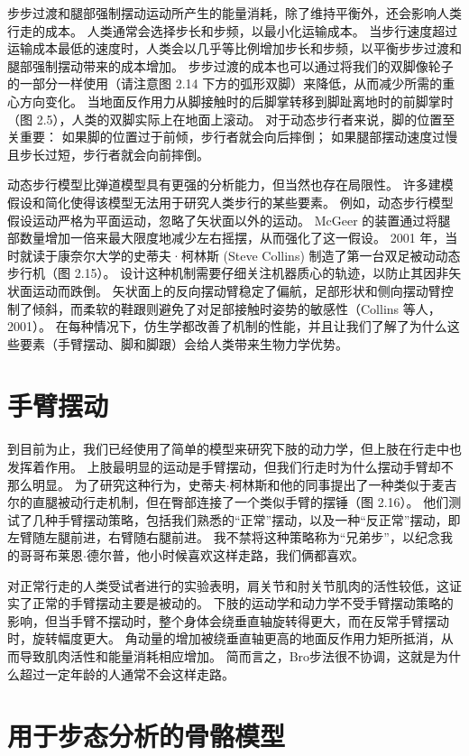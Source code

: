 步步过渡和腿部强制摆动运动所产生的能量消耗，除了维持平衡外，还会影响人类行走的成本。
人类通常会选择步长和步频，以最小化运输成本。
当步行速度超过运输成本最低的速度时，人类会以几乎等比例增加步长和步频，以平衡步步过渡和腿部强制摆动带来的成本增加。
步步过渡的成本也可以通过将我们的双脚像轮子的一部分一样使用（请注意图 2.14 下方的弧形双脚）来降低，从而减少所需的重心方向变化。
当地面反作用力从脚接触时的后脚掌转移到脚趾离地时的前脚掌时（图 2.5），人类的双脚实际上在地面上滚动。
对于动态步行者来说，脚的位置至关重要：
如果脚的位置过于前倾，步行者就会向后摔倒；
如果腿部摆动速度过慢且步长过短，步行者就会向前摔倒。


动态步行模型比弹道模型具有更强的分析能力，但当然也存在局限性。
许多建模假设和简化使得该模型无法用于研究人类步行的某些要素。
例如，动态步行模型假设运动严格为平面运动，忽略了矢状面以外的运动。
McGeer 的装置通过将腿部数量增加一倍来最大限度地减少左右摇摆，从而强化了这一假设。
2001 年，当时就读于康奈尔大学的史蒂夫·柯林斯 (Steve Collins) 制造了第一台双足被动动态步行机（图 2.15）。
设计这种机制需要仔细关注机器质心的轨迹，以防止其因非矢状面运动而跌倒。
矢状面上的反向摆动臂稳定了偏航，足部形状和侧向摆动臂控制了倾斜，而柔软的鞋跟则避免了对足部接触时姿势的敏感性（Collins 等人，2001）。
在每种情况下，仿生学都改善了机制的性能，并且让我们了解了为什么这些要素（手臂摆动、脚和脚跟）会给人类带来生物力学优势。


\section{手臂摆动}

到目前为止，我们已经使用了简单的模型来研究下肢的动力学，但上肢在行走中也发挥着作用。
上肢最明显的运动是手臂摆动，但我们行走时为什么摆动手臂却不那么明显。
为了研究这种行为，史蒂夫$\cdot$柯林斯和他的同事提出了一种类似于麦吉尔的直腿被动行走机制，但在臀部连接了一个类似手臂的摆锤（图 2.16）。
他们测试了几种手臂摆动策略，包括我们熟悉的“正常”摆动，以及一种“反正常”摆动，即左臂随左腿前进，右臂随右腿前进。
我不禁将这种策略称为“兄弟步”，以纪念我的哥哥布莱恩$\cdot$德尔普，他小时候喜欢这样走路，我们俩都喜欢。


对正常行走的人类受试者进行的实验表明，肩关节和肘关节肌肉的活性较低，这证实了正常的手臂摆动主要是被动的。
下肢的运动学和动力学不受手臂摆动策略的影响，但当手臂不摆动时，整个身体会绕垂直轴旋转得更大，而在反常手臂摆动时，旋转幅度更大。
角动量的增加被绕垂直轴更高的地面反作用力矩所抵消，从而导致肌肉活性和能量消耗相应增加。
简而言之，Bro步法很不协调，这就是为什么超过一定年龄的人通常不会这样走路。


\section{用于步态分析的骨骼模型}

